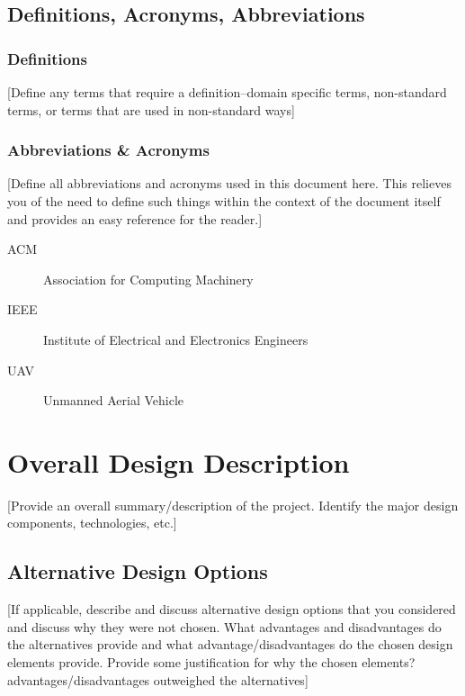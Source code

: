 \documentclass[12pt]{scrartcl} %
\begin{document}
\subsection{Definitions, Acronyms, Abbreviations}

\subsubsection{Definitions}

[Define any terms that require a definition--domain specific terms, non-standard terms, or terms that are used in non-standard ways]

\subsubsection{Abbreviations \& Acronyms}

[Define all abbreviations and acronyms used in this document here.  This relieves you of the need to define such things within the context of the document itself and provides an easy reference for the reader.]

\begin{description}
  \item[ACM] Association for Computing Machinery
  \item[IEEE] Institute of Electrical and Electronics Engineers
  \item[UAV] Unmanned Aerial Vehicle
\end{description}
  
\section{Overall Design Description}
  
[Provide an overall summary/description of the project.  Identify the major design components, technologies, etc.]
  
\subsection{Alternative Design Options}

[If applicable, describe and discuss alternative design options that you considered and discuss why they were not chosen.  What advantages and disadvantages do the alternatives provide and what advantage/disadvantages do the chosen design elements provide.  Provide some justification for why the chosen elements? advantages/disadvantages outweighed the alternatives]
\end{document}
